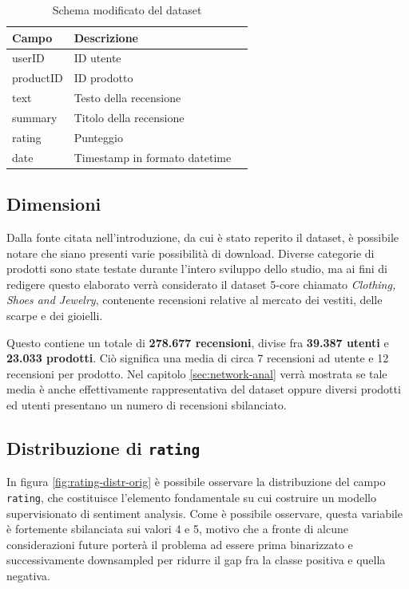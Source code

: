 \documentclass[hidelinks, 12pt]{article}
\begin{document}
\begin{table}[H]
	\caption{Schema modificato del dataset}\label{tab:df-schema-new}
	\centering
	\begin{tabular}{|l|l|l|}
		\hline
		Campo & Descrizione \\
		\hline
		userID & ID utente \\
		productID & ID prodotto \\
		text & Testo della recensione \\
		summary & Titolo della recensione \\
		rating & Punteggio \\
		date & Timestamp in formato datetime \\
		\hline
	\end{tabular}
\end{table}



\subsection{Dimensioni}
\label{sec:dimensions}

Dalla fonte citata nell'introduzione, da cui è stato reperito il dataset, è possibile notare che siano presenti varie possibilità di download. Diverse categorie di prodotti sono state testate durante l'intero sviluppo dello studio, ma ai fini di redigere questo elaborato verrà considerato il dataset 5-core chiamato \textit{Clothing, Shoes and Jewelry}, contenente recensioni relative al mercato dei vestiti, delle scarpe e dei gioielli.

Questo contiene un totale di \textbf{278.677 recensioni}, divise fra \textbf{39.387 utenti} e \textbf{23.033 prodotti}. Ciò significa una media di circa 7 recensioni ad utente e 12 recensioni per prodotto. Nel capitolo \ref{sec:network-anal} verrà mostrata se tale media è anche effettivamente rappresentativa del dataset oppure diversi prodotti ed utenti presentano un numero di recensioni sbilanciato.



\subsection{Distribuzione di \texttt{rating}}
\label{sec:rating-distr}

In figura \ref{fig:rating-distr-orig} è possibile osservare la distribuzione del campo \texttt{rating}, che costituisce l'elemento fondamentale su cui costruire un modello supervisionato di sentiment analysis. Come è possibile osservare, questa variabile è fortemente sbilanciata sui valori 4 e 5, motivo che a fronte di alcune considerazioni future porterà il problema ad essere prima binarizzato e successivamente downsampled per ridurre il gap fra la classe positiva e quella negativa.
\end{document}
